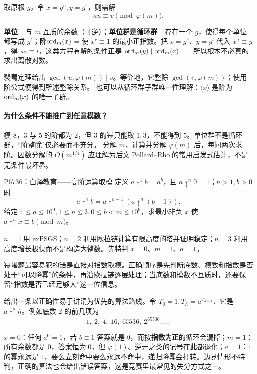 \sol 取原根 $g$，令 $x=g^u,y=g^v$，则需解
\[
 au\equiv v\pmod{\varphi(m)}.
\]

\begin{tip}[这条提示里的每个词]
\textbf{单位}= 与 $m$ 互质的余数（可逆）；\textbf{单位群是循环群}= 存在一个 $g$，使得每个单位都写成 $g^t$；\textbf{阶}$\operatorname{ord}_m(x)$ = 使 $x^r\equiv1$ 的最小正指数。把 $x=g^s$、$y=g^t$ 代入 $x^a\equiv y$，得 $sa\equiv t$，这类方程有解的条件正是 $\operatorname{ord}_m(y)\mid\operatorname{ord}_m(x)$——所以根本不必真的求出离散对数。
\end{tip}

裴蜀定理给出 $\gcd(u,\varphi(m))\mid v$。等价地，它整除 $\gcd(v,\varphi(m))$；使用阶公式便得到所述整除关系。
也可以从循环群子群唯一性理解：$\langle x\rangle$ 是阶为 $\operatorname{ord}_m(x)$ 的唯一子群。

\paragraph{为什么条件不能推广到任意模数？}
模 $8$，$3$ 与 $5$ 的阶都为 $2$，但 $3$ 的幂只能取 $1,3$，不能得到 $5$。单位群不是循环群，“阶整除”仅必要而不充分。
\cost 分解 $m$、计算并分解 $\varphi(m)$ 后，每问两次求阶。因数分解的 $O(m^{1/4})$ 应理解为后文 Pollard--Rho 的常用启发式估计，不是无条件最坏界。


\begin{problem}{P6736：白泽教育——高阶运算取模}
定义 $a\uparrow^1 b=a^b$，且 $a\uparrow^n0=1$；$n>1,b>0$ 时
\[
 a\uparrow^n b=a\uparrow^{n-1}(a\uparrow^n(b-1)).
\]
给定 $1\le a\le10^9,1\le n\le3,0\le b<m\le10^9$，求最小非负 $x$ 使 $a\uparrow^n x\equiv b\pmod m$。
\end{problem}
\hint $n=1$ 用 exBSGS；$n=2$ 利用欧拉链计算有限高度的塔并证明稳定；$n=3$ 利用高度增长极快而不是构造大整数。先特判 $x=0$、$m=1$、$a=1$。

\begin{pitfall}[讲解：先看这题到底在做什么]
幂塔题最容易犯的错是直接对指数取模。正确顺序是先判断底数、模数和指数是否处于“可以降幂”的条件，再沿欧拉链逐层处理；当底数和模数不互质时，还要保留“指数是否已经足够大”这一位信息。
\end{pitfall}

\sol 给出一条以正确性易于讲清为优先的算法路线。令 $T_0=1,T_h=a^{T_{h-1}}$，它是 $a\uparrow^2h$。例如底数 $2$ 的前几项为
\[
1,\ 2,\ 4,\ 16,\ 65536,\ 2^{65536},\ldots.
\]

\begin{tip}[为什么这三个特判不能省]
$x=0$：任何 $a^0=1$，若 $b\equiv1$ 答案就是 $0$，而按\textbf{指数为正}的循环会漏掉；$m=1$：所有余数都是 $0$，答案恒为 $0$，但 $\varphi(1)$、逆元之类的记号在此都退化；$a=1$：$1$ 的幂永远是 $1$，要么立刻命中要么永远不命中，递归降幂会打转。边界情形不特判，正确的算法也会给出错误答案，这是竞赛里最常见的失分方式之一。
\end{tip}

